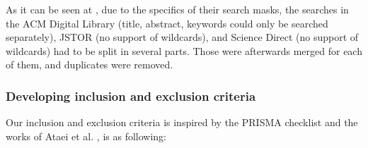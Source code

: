 \documentclass[conference]{IEEEtran}
\begin{document}
        











    

As it can be seen at \cite{SLRsearchTerms}, due to the specifics of their search masks, the searches in the ACM Digital Library (title, abstract, keywords could only be searched separately), JSTOR (no support of wildcards), and Science Direct (no support of wildcards) had to be split in several parts. Those were afterwards merged for each of them, and duplicates were removed. 

\subsubsection{Developing inclusion and exclusion criteria}

Our inclusion and exclusion criteria is inspired by the PRISMA checklist \cite{tricco2018prisma} and the works of Ataei et al. \cite{ataei2020big}, is as following: 
\end{document}
